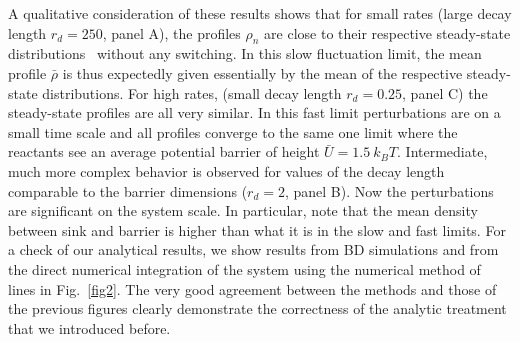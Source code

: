 \documentclass[preprint,superscriptaddress]{revtex4-1}
\begin{document}
A qualitative consideration of these results shows that for small rates (large decay length $r_d = 250$, panel A), the profiles $\rho_n$ are close to their respective steady-state distributions~\cite{Debye1942} without any switching. In this slow fluctuation limit, the mean profile $\bar{\rho}$ is thus expectedly given essentially by the mean of the respective steady-state distributions. For high rates, (small decay length $r_d = 0.25$, panel C) the steady-state profiles are all very similar. In this fast limit  perturbations are on a small time scale and all profiles converge to the same one limit where the reactants see an average potential barrier of height $\bar U = 1.5~k_BT$.  Intermediate, much more complex behavior is observed for values of the decay length comparable to the barrier dimensions ($r_d = 2$, panel B).  Now the perturbations are significant on the system scale.  In particular, note that the mean density between sink and barrier 
is higher than what it is in the slow and fast limits.  For a check of our analytical results, we show results from BD simulations and from the direct 
numerical integration of the system using the numerical method of lines in Fig.~\ref{fig2}. The very good agreement between the methods and those of the 
previous figures clearly demonstrate the correctness of the analytic treatment that we introduced before. 
\end{document}
